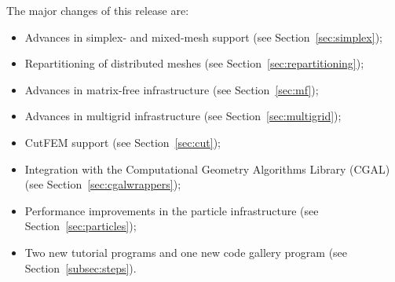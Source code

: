 \documentclass{ansarticle-preprint}
\begin{document}
The major changes of this release are:
%
\begin{itemize}
  \item Advances in simplex- and mixed-mesh support (see Section~\ref{sec:simplex});
  \item Repartitioning of distributed meshes (see Section~\ref{sec:repartitioning});
  \item Advances in matrix-free infrastructure (see Section~\ref{sec:mf});
  \item Advances in multigrid infrastructure (see Section~\ref{sec:multigrid});
  \item CutFEM support (see Section~\ref{sec:cut});
  \item Integration with the Computational Geometry Algorithms Library (CGAL) (see Section~\ref{sec:cgalwrappers});
  \item Performance improvements in the particle infrastructure (see Section~\ref{sec:particles});
  \item Two new tutorial programs and one new code gallery program (see
    Section~\ref{subsec:steps}).
\end{itemize}
%
\end{document}
